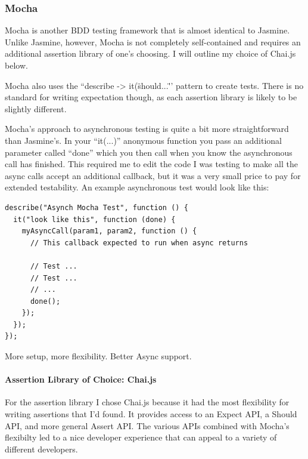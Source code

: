 \documentclass[11pt]{article}
\begin{document}
\subsubsection{Mocha \cite{Mocha}}
Mocha is another BDD testing framework that is almost identical to Jasmine. Unlike Jasmine, however, Mocha is not completely self-contained and requires an additional assertion library of one's choosing. I will outline my choice of Chai.js below.

Mocha also uses the ``describe -> it(\"should...\" '' pattern to create tests. There is no standard for writing expectation though, as each assertion library is likely to be slightly different.

Mocha's approach to asynchronous testing is quite a bit more straightforward than Jasmine's. In your ``it(...)'' anonymous function you pass an additional parameter called ``done'' which you then call when you know the asynchronous call has finished. This required me to edit the code I was testing to make all the async calls accept an additional callback, but it was a very small price to pay for extended testability. An example asynchronous test would look like this:
\begin{lstlisting}
describe("Asynch Mocha Test", function () {
  it("look like this", function (done) {
    myAsyncCall(param1, param2, function () {
      // This callback expected to run when async returns

      // Test ...
      // Test ...
      // ...
      done();
    });
  });
});
\end{lstlisting}

More setup, more flexibility.
Better Async support.

\paragraph{Assertion Library of Choice: Chai.js \cite{Chaijs}}
For the assertion library I chose Chai.js because it had the most flexibility for writing assertions that I'd found. It provides access to an Expect API, a Should API, and more general Assert API. The various APIs combined with Mocha's flexibilty led to a nice developer experience that can appeal to a variety of different developers.
\end{document}
